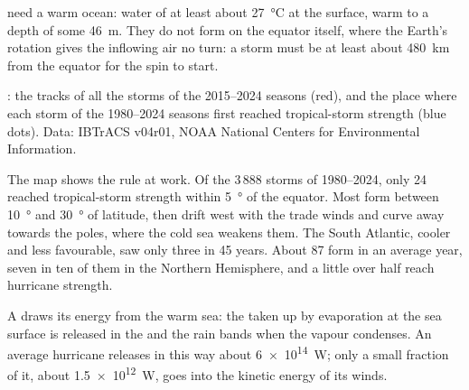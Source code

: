  need a warm ocean: water of at least about
\qty{27}{\degreeCelsius} at the surface, warm to a depth of some
\qty{46}{m}. They do not form on the equator itself, where the Earth's
rotation gives the inflowing air no turn: a storm must be at least about
\qty{480}{km} from the equator for the spin to start.

\begin{omfigure}

{\small {}: the tracks of all the storms of the 2015--2024
seasons (red), and the place where each storm of the 1980--2024 seasons
first reached tropical-storm strength (blue dots). Data: IBTrACS v04r01,
NOAA National Centers for Environmental Information.}
\end{omfigure}

The map shows the rule at work. Of the 3\,888 storms of 1980--2024, only 24
reached tropical-storm strength within \qty{5}{\degree} of the equator. Most
form between \qty{10}{\degree} and \qty{30}{\degree} of latitude, then
drift west with the trade winds and curve away towards the poles, where the
cold sea weakens them. The South Atlantic, cooler and less favourable, saw
only three in 45 years. About 87  form in an average year,
seven in ten of them in the Northern Hemisphere, and a little over half
reach hurricane strength.

\begin{proposition}\label{prop:g10:storms-and-cyclones:energy}
A  draws its energy from the warm sea: the  taken
up by evaporation at the sea surface is released in the  and the rain
bands when the vapour condenses. An average hurricane releases in this way
about \qty{6e14}{W}; only a small fraction of it, about \qty{1.5e12}{W},
goes into the kinetic energy of its winds.
\end{proposition}

